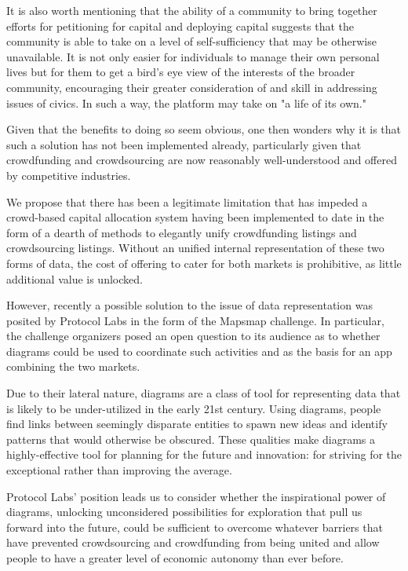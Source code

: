 \documentclass{article}
\begin{document}
It is also worth mentioning that the ability of a community to bring together efforts for petitioning for capital and deploying capital suggests that the community is able to take on a level of self-sufficiency that may be otherwise unavailable. It is not only easier for individuals to manage their own personal lives but for them to get a bird's eye view of the interests of the broader community, encouraging their greater consideration of and skill in addressing issues of civics. 
In such a way, the platform may take on "a life of its own."

Given that the benefits to doing so seem obvious, one then wonders why it is that such a solution has not been implemented already, particularly given that crowdfunding and crowdsourcing are now reasonably well-understood and offered by competitive industries.

We propose that there has been a legitimate limitation that has impeded a crowd-based capital allocation system having been implemented to date in the form of a dearth of methods to elegantly unify crowdfunding listings and crowdsourcing listings. Without an unified internal representation of these two forms of data, the cost of offering to cater for both markets is prohibitive, as little additional value is unlocked.

However, recently a possible solution to the issue of data representation was posited by Protocol Labs in the form of the Mapsmap challenge. In particular, the challenge organizers posed an open question to its audience as to whether diagrams could be used to coordinate such activities and as the basis for an app combining the two markets.

Due to their lateral nature, diagrams are a class of tool for representing data that is likely to be under-utilized in the early 21st century. Using diagrams, people find links between seemingly disparate entities to spawn new ideas and identify patterns that would otherwise be obscured. These qualities make diagrams a highly-effective tool for planning for the future and innovation: for striving for the exceptional rather than improving the average.

Protocol Labs' position leads us to consider whether the inspirational power of diagrams, unlocking unconsidered possibilities for exploration that pull us forward into the future, could be sufficient to overcome whatever barriers that have prevented crowdsourcing and crowdfunding from being united and allow people to have a greater level of economic autonomy than ever before.
\end{document}
